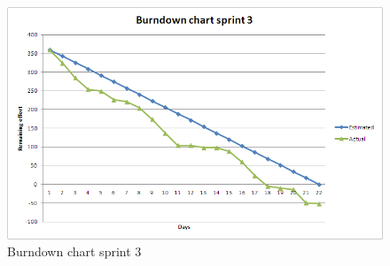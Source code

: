\begin{figure}
	\includegraphics[width=\textwidth]{burndown3.png}
	\caption{Burndown chart sprint 3}
	\label{fig:burndown3}
\end{figure}